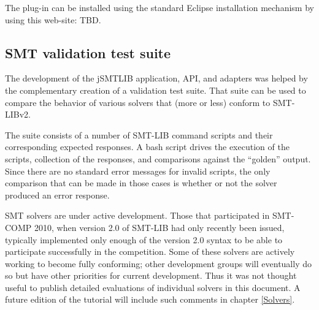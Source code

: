 \documentclass[12pt,oneside]{report}
\begin{document}
The plug-in can be installed using the standard Eclipse installation mechanism by using this web-site: 
TBD.


\subsection{SMT validation test suite}

The development of the jSMTLIB application, API, and adapters was helped by the complementary
creation of a validation test suite. That suite can be used to compare the behavior of various
solvers that (more or less) conform to SMT-LIBv2.

The suite consists of a number of SMT-LIB command scripts and their corresponding expected responses.
A bash script drives the execution of the scripts, collection of the responses, and comparisons against
the ``golden'' output.  Since there are no standard error messages for invalid scripts, the only
comparison that can be made in those cases is whether or not the solver produced an error response.

SMT solvers are under active development. Those that participated in SMT-COMP 2010, when version 2.0 of
SMT-LIB had only recently been issued, typically implemented only enough of the version 2.0 syntax to be
able to participate successfully in the competition.  Some of these solvers are actively working to
become fully conforming; other development groups will eventually do so but have other priorities for
current development.  Thus it was not thought useful to publish detailed evaluations of individual solvers
in this document. A future edition of the tutorial will include such comments in chapter \ref{Solvers}.
\end{document}
